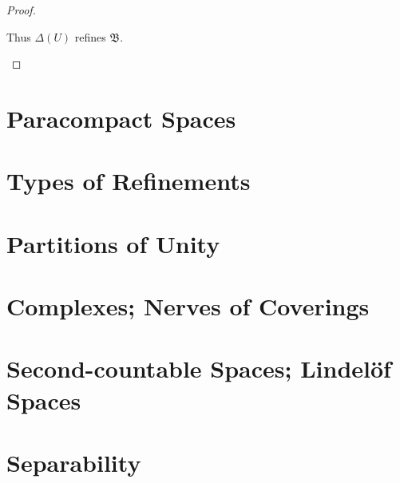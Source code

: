 \begin{proof}
\begin{enumerate}[label={(\alph*)}]
		      Thus \( \Delta(U) \) refines \( \mathfrak{B} \).
	\end{enumerate}
\end{proof}

\section{Paracompact Spaces}

\section{Types of Refinements}

\section{Partitions of Unity}

\section{Complexes; Nerves of Coverings}

\section{Second-countable Spaces; Lindel\"{o}f Spaces}

\section{Separability}
